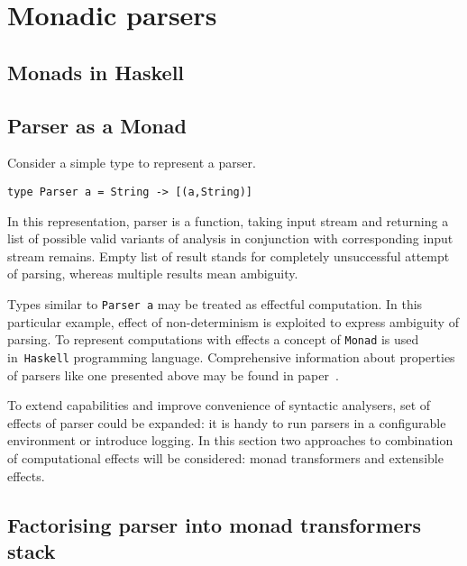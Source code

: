   \section{Monadic parsers}
  \label{cpt-parsers:monadic}

    \subsection{Monads in Haskell}

    \subsection{Parser as a Monad}

Consider a simple type to represent a parser.

\begin{lstlisting}
type Parser a = String -> [(a,String)]
\end{lstlisting}

In this representation, parser is a
function, taking input stream and returning a list of possible valid
variants of analysis in conjunction with corresponding input stream
remains. Empty list of result stands for completely unsuccessful attempt of
parsing, whereas multiple results mean ambiguity.

Types similar to \texttt{Parser a} may be treated as effectful computation. In this
particular example, effect of non-determinism is exploited to express ambiguity
of parsing. To represent computations with effects a concept of \texttt{Monad} is used in~\texttt{Haskell} programming language. Comprehensive information about
properties of parsers like one presented above may be found in
paper~\cite{monParsing}.

To extend capabilities and improve convenience of syntactic analysers, set of
effects of parser could be expanded: it is handy to run parsers in a configurable
environment or introduce logging. In this section two approaches to combination
of computational effects will be considered: monad transformers and extensible
effects.

    \subsection{Factorising parser into monad transformers stack}